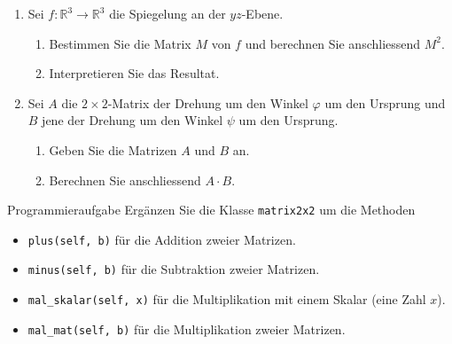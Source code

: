 \begin{ueb}
\begin{enumerate}
        \item Sei \( f: \mathbb{R}^3 \to \mathbb{R}^3 \) die Spiegelung an der $yz$-Ebene. 
        \begin{enumerate}
            \item Bestimmen Sie die Matrix \( M \) von \( f \) und berechnen Sie anschliessend \( M^2 \).
            \item Interpretieren Sie das Resultat.
        \end{enumerate}
    
        \item Sei \( A \) die \( 2 \times 2 \)-Matrix der Drehung um den Winkel \( \varphi \) um den Ursprung und \( B \) jene der Drehung um den Winkel \( \psi \) um den Ursprung.
        \begin{enumerate}
            \item Geben Sie die Matrizen \( A \) und \( B \) an.
            \item Berechnen Sie anschliessend \( A \cdot B \).
        \end{enumerate}
    \end{enumerate}
    
\end{ueb}

\begin{ueb}
    {Programmieraufgabe}{}
    Ergänzen Sie die Klasse \lstinline|matrix2x2| um die Methoden
    \begin{itemize}
        \item \lstinline|plus(self, b)| für die Addition zweier Matrizen.
        \item \lstinline|minus(self, b)| für die Subtraktion zweier Matrizen. 
        \item \lstinline|mal_skalar(self, x)| für die Multiplikation mit einem Skalar (eine Zahl $x$).
        \item \lstinline|mal_mat(self, b)| für die Multiplikation zweier Matrizen.
    \end{itemize}
\end{ueb}

